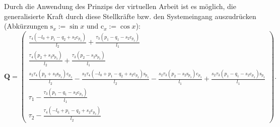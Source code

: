 Durch die Anwendung des Prinzips der virtuellen Arbeit ist es möglich, die generalisierte Kraft durch diese Stellkräfte bzw. den Systemeingang auszudrücken (Abkürzungen $\mathrm{s}_x := \sin{x}$ und $\mathrm{c}_x := \cos{x}$):
\begin{equation}
	\mathbf{Q}=
	\left(\begin{smallmatrix}
		\frac{\tau_{4} \left(- l_{0} + p_{1} - q_{2} + s_{2} \mathrm{c}_{p_{3}}\right)}{l_{2}} + \frac{\tau_{3} \left(p_{1} - q_{1} - s_{2} \mathrm{c}_{p_{3}}\right)}{l_{1}}\\
		\frac{\tau_{4} \left(p_{2} + s_{2} \mathrm{s}_{p_{3}}\right)}{l_{2}} + \frac{\tau_{3} \left(p_{2} - s_{2} \mathrm{s}_{p_{3}}\right)}{l_{1}}\\
		\frac{s_{2} \tau_{4} \left(p_{2} + s_{2} \mathrm{s}_{p_{3}}\right) \mathrm{c}_{p_{3} }}{l_{2}} - \frac{s_{2} \tau_{4} \left(- l_{0} + p_{1} - q_{2} + s_{2} \mathrm{c}_{p_{3} }\right) \mathrm{s}_{p_{3}}}{l_{2}} - \frac{s_{2} \tau_{3} \left(p_{2} - s_{2} \mathrm{s}_{p_{3}}\right) \mathrm{c}_{p_{3}}}{l_{1}} + \frac{s_{2} \tau_{3} \left(p_{1} - q_{1} - s_{2} \mathrm{c}_{p_{3}}\right) \mathrm{s}_{p_{3}}}{l_{1}}\\
		\tau_{1} - \frac{\tau_{3} \left(p_{1} - q_{1} - s_{2} \mathrm{c}_{p_{3} }\right)}{l_{1}}\\
		\tau_{2} - \frac{\tau_{4} \left(- l_{0} + p_{1} - q_{2} + s_{2} \mathrm{c}_{p_{3} }\right)}{l_{2}}
	\end{smallmatrix}\right).
\end{equation}

